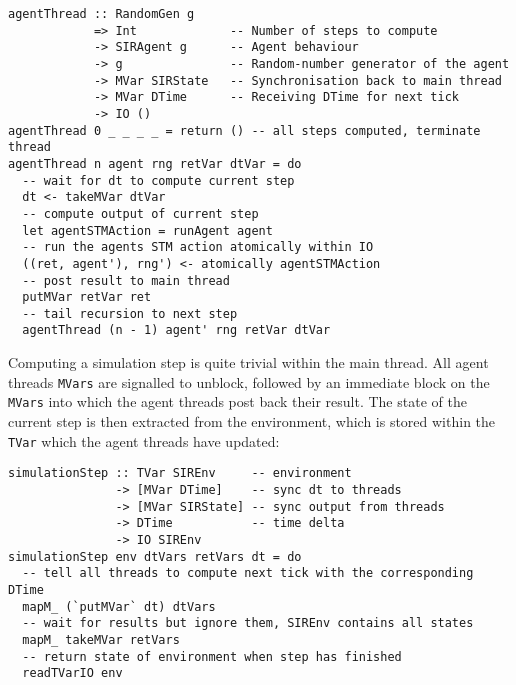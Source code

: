 \begin{footnotesize}
\begin{verbatim}
agentThread :: RandomGen g 
            => Int             -- Number of steps to compute
            -> SIRAgent g      -- Agent behaviour 
            -> g               -- Random-number generator of the agent
            -> MVar SIRState   -- Synchronisation back to main thread
            -> MVar DTime      -- Receiving DTime for next tick
            -> IO ()
agentThread 0 _ _ _ _ = return () -- all steps computed, terminate thread
agentThread n agent rng retVar dtVar = do
  -- wait for dt to compute current step
  dt <- takeMVar dtVar
  -- compute output of current step
  let agentSTMAction = runAgent agent
  -- run the agents STM action atomically within IO
  ((ret, agent'), rng') <- atomically agentSTMAction 
  -- post result to main thread
  putMVar retVar ret
  -- tail recursion to next step 
  agentThread (n - 1) agent' rng retVar dtVar
\end{verbatim}
\end{footnotesize}

Computing a simulation step is quite trivial within the main thread. All agent threads \texttt{MVars} are signalled to unblock, followed by an immediate block on the \texttt{MVars} into which the agent threads post back their result. The state of the current step is then extracted from the environment, which is stored within the \texttt{TVar} which the agent threads have updated:

\begin{footnotesize}
\begin{verbatim}
simulationStep :: TVar SIREnv     -- environment 
               -> [MVar DTime]    -- sync dt to threads
               -> [MVar SIRState] -- sync output from threads
               -> DTime           -- time delta
               -> IO SIREnv
simulationStep env dtVars retVars dt = do
  -- tell all threads to compute next tick with the corresponding DTime
  mapM_ (`putMVar` dt) dtVars
  -- wait for results but ignore them, SIREnv contains all states
  mapM_ takeMVar retVars
  -- return state of environment when step has finished
  readTVarIO env
\end{verbatim}
\end{footnotesize}
